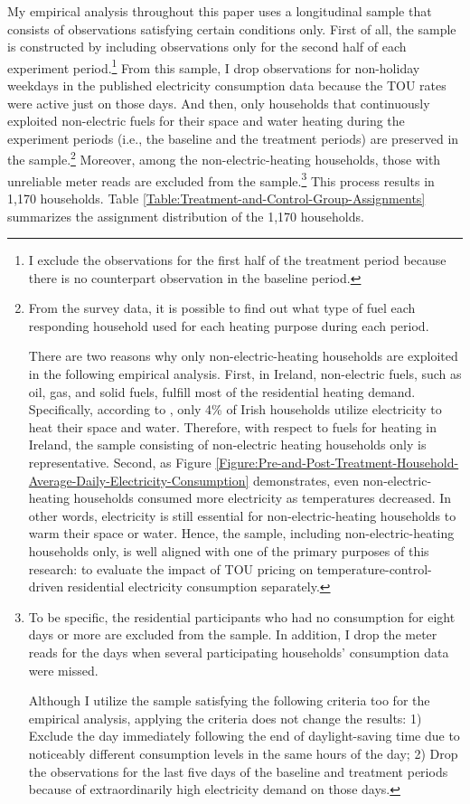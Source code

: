 My empirical analysis throughout this paper uses a longitudinal sample that consists of observations satisfying certain conditions only. First of all, the sample is constructed by including observations only for the second half of each experiment period.\footnote{I exclude the observations for the first half of the treatment period because there is no counterpart observation in the baseline period.} From this sample, I drop observations for non-holiday weekdays in the published electricity consumption data because the TOU rates were active just on those days. And then, only households that continuously exploited non-electric fuels for their space and water heating during the experiment periods (i.e., the baseline and the treatment periods) are preserved in the sample.\footnote{From the survey data, it is possible to find out what type of fuel each responding household used for each heating purpose during each period. \par
There are two reasons why only non-electric-heating households are exploited in the following empirical analysis. First, in Ireland, non-electric fuels, such as oil, gas, and solid fuels, fulfill most of the residential heating demand. Specifically, according to \cite{Heating-and-Cooling-in-Ireland-Today_SEAI_2022}, only 4\% of Irish households utilize electricity to heat their space and water. Therefore, with respect to fuels for heating in Ireland, the sample consisting of non-electric heating households only is representative. Second, as Figure \ref{Figure:Pre-and-Post-Treatment-Household-Average-Daily-Electricity-Consumption} demonstrates, even non-electric-heating households consumed more electricity as temperatures decreased. In other words, electricity is still essential for non-electric-heating households to warm their space or water. Hence, the sample, including non-electric-heating households only, is well aligned with one of the primary purposes of this research: to evaluate the impact of TOU pricing on temperature-control-driven residential electricity consumption separately.} Moreover, among the non-electric-heating households, those with unreliable meter reads are excluded from the sample.\footnote{To be specific, the residential participants who had no consumption for eight days or more are excluded from the sample. In addition, I drop the meter reads for the days when several participating households' consumption data were missed. \par
Although I utilize the sample satisfying the following criteria too for the empirical analysis, applying the criteria does not change the results: 1) Exclude the day immediately following the end of daylight-saving time due to noticeably different consumption levels in the same hours of the day; 2) Drop the observations for the last five days of the baseline and treatment periods because of extraordinarily high electricity demand on those days.} This process results in 1,170 households. Table \ref{Table:Treatment-and-Control-Group-Assignments} summarizes the assignment distribution of the 1,170 households.  


